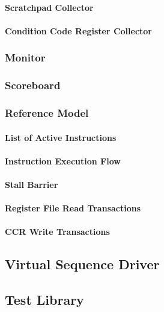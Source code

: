 \paragraph{Scratchpad Collector}

\paragraph{Condition Code Register Collector}

\subsubsection{Monitor}

\subsubsection{Scoreboard}

\subsubsection{Reference Model}

\paragraph{List of Active Instructions}

\paragraph{Instruction Execution Flow}

\paragraph{Stall Barrier}

\paragraph{Register File Read Transactions}

\paragraph{CCR Write Transactions}

\subsection{Virtual Sequence Driver}

\subsection{Test Library}